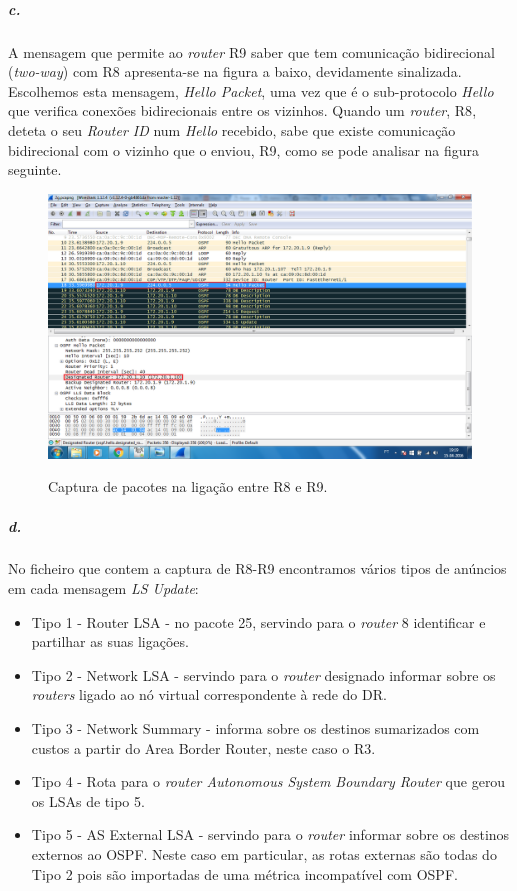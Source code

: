 \subparagraph{c.}
A mensagem que permite ao \emph{router} \textsf{R9} saber que tem comunicação bidirecional (\emph{two-way}) com \textsf{R8} apresenta-se na figura a baixo, devidamente sinalizada. Escolhemos esta mensagem, \emph{Hello Packet}, uma vez que é o sub-protocolo \emph{Hello} que verifica conexões bidirecionais entre os vizinhos. Quando um \emph{router}, \textsf{R8}, deteta o seu \emph{Router ID} num \emph{Hello} recebido, sabe que existe comunicação bidirecional com o vizinho que o enviou, \textsf{R9}, como se pode analisar na figura seguinte.

\begin{figure}[h]
\centering
\includegraphics[width=1\textwidth, height=0.45\textheight]{2c.png}
\label{fig:captura R8-R9}
\caption{Captura de pacotes na ligação entre \textsf{R8} e \textsf{R9}.}
\end{figure}

\subparagraph{d.}

No ficheiro que contem a captura de \textsf{R8-R9} encontramos vários
tipos de anúncios em cada mensagem \emph{LS Update}:
\begin{itemize}
  \item Tipo 1 - Router LSA - no pacote 25, servindo para o \emph{router} 8
    identificar e partilhar as suas ligações.
  \item Tipo 2 - Network LSA - servindo para o \emph{router} designado informar
    sobre os \emph{routers} ligado ao nó virtual correspondente à rede
    do DR.
  \item Tipo 3 - Network Summary - informa sobre os destinos
    sumarizados com custos a partir do Area Border Router, neste caso
    o R3.
  \item Tipo 4 - Rota para o \emph{router Autonomous System Boundary
    Router} que gerou os LSAs de tipo 5.
  \item Tipo 5 - AS External LSA - servindo para o \emph{router}
    informar sobre os destinos externos ao OSPF. Neste caso em
    particular, as rotas externas são todas do Tipo 2 pois são
    importadas de uma métrica incompatível com OSPF.
\end{itemize}


